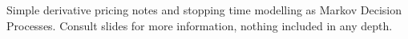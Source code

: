\documentclass[11pt]{article}
\begin{document}
\maketitle
\thispagestyle{first}
Simple derivative pricing notes and stopping time modelling as Markov Decision Processes. Consult slides for more information, nothing included in any depth. 
\end{document}
